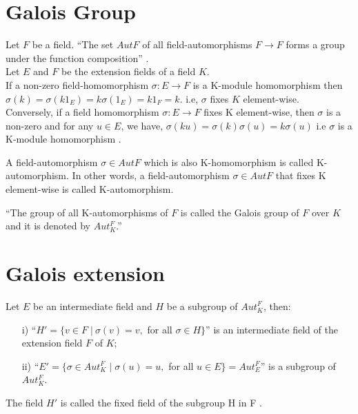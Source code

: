 \section{Galois Group}
Let \(F\) be a field. ``The set \(AutF\) of all field-automorphisms \(F \rightarrow F \) forms a group under the function composition'' \cite{hunger}.\\[3mm]
\noindent
Let \(E\) and \(F\) be the extension fields of a field \(K\).\\
If a non-zero field-homomorphism \(\sigma : E \rightarrow F\) is a K-module homomorphism then\\
\(\sigma(k)=\sigma(k1_E)=k\sigma(1_E)=k1_F=k\).\hspace{7mm}
i.e, \(\sigma\) fixes \(K\) element-wise.\\
Conversely, if a field homomorphism \(\sigma : E \rightarrow F\) fixes K element-wise, then \(\sigma\) is a non-zero and for any \(u \in E\), we have, \(\sigma(ku)=\sigma(k)\sigma(u)=k\sigma(u)\)
i.e \(\sigma\) is a K-module homomorphism \cite{hunger}.
\begin{definition} \cite{hunger}
  A field-automorphism \(\sigma \in Aut F\) which is also K-homomorphism is called K-automorphism. In other words, a field-automorphism \(\sigma \in Aut F\) that fixes K element-wise is called K-automorphism.
\end{definition}

\begin{definition} \cite{hunger}
  ``The group of all K-automorphisms of \(F\) is called the Galois group of \(F\) over \(K\) and it is denoted by \(Aut_K^F\).''
\end{definition}

\section{Galois extension}
Let \(E\) be an intermediate field and \(H\) be a subgroup of \(Aut_K^F\), then:
\begin{enumerate}
\item[i)] ``\(H' = \{v \in F \; | \: \sigma(v)=v,\) for all \(\sigma \in H \}\)'' \cite{hunger} is an intermediate field of the extension field \(F\) of \(K\);
\item[ii)] ``\(E' = \{\sigma \in Aut_K^F \; | \; \sigma(u)=u,\) for all \(u \in E\}=Aut_E^F\)'' \cite{hunger} is a subgroup of \(Aut_K^F\).
\end{enumerate}

The field \(H'\) is called the fixed field of the subgroup H in F \cite{hunger}.

